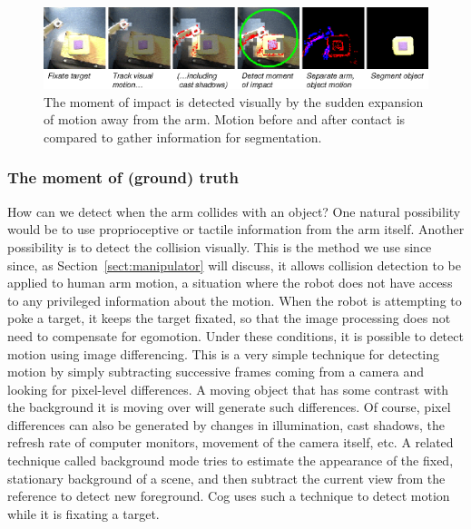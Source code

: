 
\begin{figure}[tbh]
  \begin{center}
\includegraphics[width=\columnwidth]{fig-poke-zoom.eps}
  \end{center}
  \caption{
  \label{fig:poke-zoom}
    The moment of impact is detected visually by the
    sudden expansion of motion away from the arm.  Motion before and
    after contact is compared to gather information for segmentation.
}
\end{figure}


\subsubsection*{The moment of (ground) truth}

How can we detect when the arm collides with an object?  One natural
possibility would be to use proprioceptive or tactile information from
the arm itself.  Another possibility is to detect the collision
visually.  This is the method we use 
\ifrevised
since
\else
since, as
Section~\ref{sect:manipulator} will discuss, 
\fi
it allows collision
detection to be applied to human arm motion, a situation where the robot
does not have access to any privileged information about the motion.  When the robot 
is attempting to poke a target, it keeps the target fixated,
so that the image processing does not need to compensate for
egomotion.
Under these conditions, it is possible to detect motion using
image differencing.
This is a very simple technique for detecting motion by
simply subtracting successive frames coming from a camera and looking for
pixel-level differences.  A moving object that has some contrast with
the background it is moving over will generate such differences.  Of
course, pixel differences can also be generated by changes in
illumination, cast shadows, the refresh rate of computer monitors, movement of the camera
itself, etc.  A related technique called background mode\ling{} tries to
estimate the appearance of the fixed, stationary background of a 
scene, and then subtract the current view from the reference to 
detect new foreground.  Cog uses such a technique to detect motion
while it is fixating a target.

